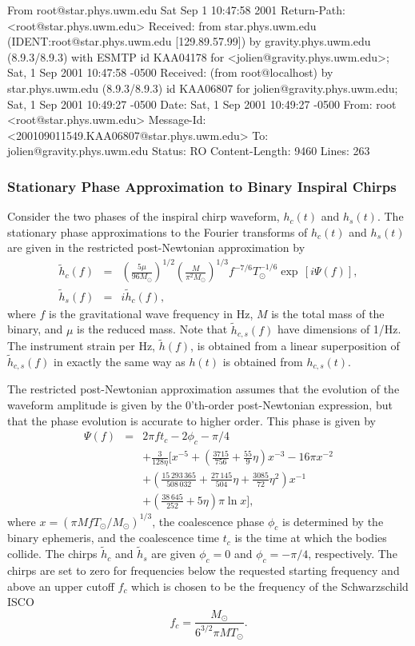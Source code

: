From root@star.phys.uwm.edu  Sat Sep  1 10:47:58 2001
Return-Path: <root@star.phys.uwm.edu>
Received: from star.phys.uwm.edu (IDENT:root@star.phys.uwm.edu [129.89.57.99])
	by gravity.phys.uwm.edu (8.9.3/8.9.3) with ESMTP id KAA04178
	for <jolien@gravity.phys.uwm.edu>; Sat, 1 Sep 2001 10:47:58 -0500
Received: (from root@localhost)
	by star.phys.uwm.edu (8.9.3/8.9.3) id KAA06807
	for jolien@gravity.phys.uwm.edu; Sat, 1 Sep 2001 10:49:27 -0500
Date: Sat, 1 Sep 2001 10:49:27 -0500
From: root <root@star.phys.uwm.edu>
Message-Id: <200109011549.KAA06807@star.phys.uwm.edu>
To: jolien@gravity.phys.uwm.edu
Status: RO
Content-Length: 9460
Lines: 263

\subsubsection*{Stationary Phase Approximation to Binary Inspiral Chirps}

Consider the two phases of the inspiral chirp waveform, 
$h_c(t)$ and $h_s(t)$.  The stationary phase approximations to the 
Fourier transforms of $h_c(t)$ and $h_s(t)$ are given in the 
restricted post-Newtonian approximation by
\begin{eqnarray}
\label{e:chirpcosfreq}
\tilde{h}_c(f)&=&\left(\frac{5\mu}{96M_\odot}\right)^{1/2}
\left(\frac{M}{\pi^2M_\odot}\right)^{1/3}f^{-7/6}T_\odot^{-1/6}
\exp\,[i\Psi(f)],\\
\tilde{h}_s(f)&=&i\tilde{h}_c(f),
\end{eqnarray}
where $f$ is the gravitational wave frequency in Hz, $M$ is the total
mass of the binary, and $\mu$ is the reduced mass.  Note that
$\tilde{h}_{c,s}(f)$ have dimensions of 1/Hz.  The instrument strain
per Hz, $\tilde{h}(f)$, is obtained from a linear superposition of
$\tilde{h}_{c,s}(f)$ in exactly the same way as $h(t)$ is obtained from
$h_{c,s}(t)$.

The restricted post-Newtonian approximation assumes that the evolution
of the waveform amplitude is given by the 0'th-order post-Newtonian
expression, but that the phase evolution is accurate to higher order.
This phase is given by
\begin{eqnarray}
\Psi(f)&=&2\pi ft_c-2\phi_c-\pi/4\nonumber\\
&&+\frac{3}{128\eta}\biggl[x^{-5}+
\left(\frac{3715}{756}+\frac{55}{9}\eta\right)x^{-3}
-16\pi x^{-2}\nonumber\\
&&+\left(\frac{15\,293\,365}{508\,032}+\frac{27\,145}{504}\eta
+\frac{3085}{72}\eta^2\right)x^{-1}\nonumber\\
&&+\left(\frac{38\,645}{252}+5\eta\right)\pi\ln{x}\biggr],
\end{eqnarray}
where $x=(\pi MfT_\odot/M_\odot)^{1/3}$, the coalescence phase
$\phi_c$ is determined by the binary ephemeris, and the coalescence
time $t_c$ is the time at which the bodies collide.  The chirps
$\tilde{h}_c$ and $\tilde{h}_s$ are given $\phi_c=0$ and
$\phi_c=-\pi/4$, respectively. The chirps are set to zero for 
frequencies below the requested starting frequency and above 
an upper cutoff $f_c$ which is chosen to be the frequency of the 
Schwarzschild ISCO
\begin{equation}
f_c=\frac{M_\odot}{6^{3/2}\pi MT_\odot}.
\end{equation}

